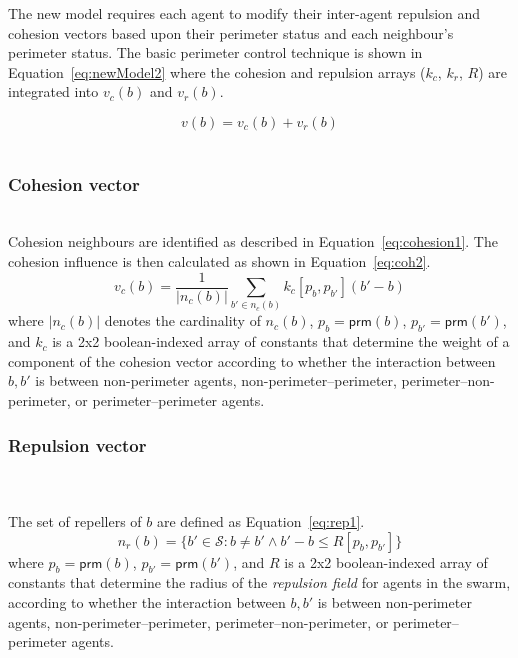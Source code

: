 \documentclass[12pt,a4paper]{IEEEtran}
\newcommand{\vbb}[2]{#2-#1}
\newcommand{\prm}{\mathsf{prm}}
\newcommand{\kc}{\mathit{k_{c}}}
\newcommand{\kr}{\mathit{k_{r}}}
\newcommand{\rb}{\mathit{R}}
\begin{document}
The new model requires each agent to modify their inter-agent repulsion and cohesion vectors based upon their perimeter status and each neighbour's perimeter status. The basic perimeter control technique is shown in Equation~\ref{eq:newModel2} where the cohesion and repulsion arrays ($\kc$, $\kr$, $\rb$) are integrated into $v_c(b)$ and $v_r(b)$.

\begin{equation}\label{eq:newModel2}
v(b) = v_c(b) + v_r(b)
\end{equation}\\

\subsubsection{Cohesion vector}~\\
Cohesion neighbours are identified as  described in Equation~\ref{eq:cohesion1}. The cohesion influence is then calculated as shown in Equation~\ref{eq:coh2}.
\begin{equation}\label{eq:coh2}
	v_c(b) = \frac{1}{|n_c(b)|} \sum_{b' \in n_c(b)} \kc[p_b, p_{b'}] (b' - b)
\end{equation}
where $|n_c(b)|$ denotes the cardinality of $n_c(b)$, $p_b = \prm(b)$, $p_{b'} 
= \prm(b')$, and 
$\kc$ is a 2x2 boolean-indexed array of constants that determine the weight
of a component of the cohesion vector according to
whether the interaction between $b,b'$ is between non-perimeter agents,
non-perimeter--perimeter, perimeter--non-perimeter, or perimeter--perimeter
agents.

\subsubsection{Repulsion vector}~\\
~\\
The set of repellers of $b$ are defined as Equation~\ref{eq:rep1}.
\small
\begin{equation}\label{eq:rep1}
	n_r(b) = \{b' \in \mathcal{S} : b \neq b' \wedge \vbb{b}{b'} \leq \rb[p_b,p_{b'}]\}
\end{equation}
\normalsize
where $p_b = \prm(b)$, $p_{b'} = \prm(b')$, and $\rb$ is a 2x2 boolean-indexed
array of constants that determine the radius of the \emph{repulsion field} for agents in the swarm, according to whether the interaction between $b,b'$ is between non-perimeter agents, non-perimeter--perimeter,
perimeter--non-perimeter, or perimeter--perimeter agents.\\
\end{document}
